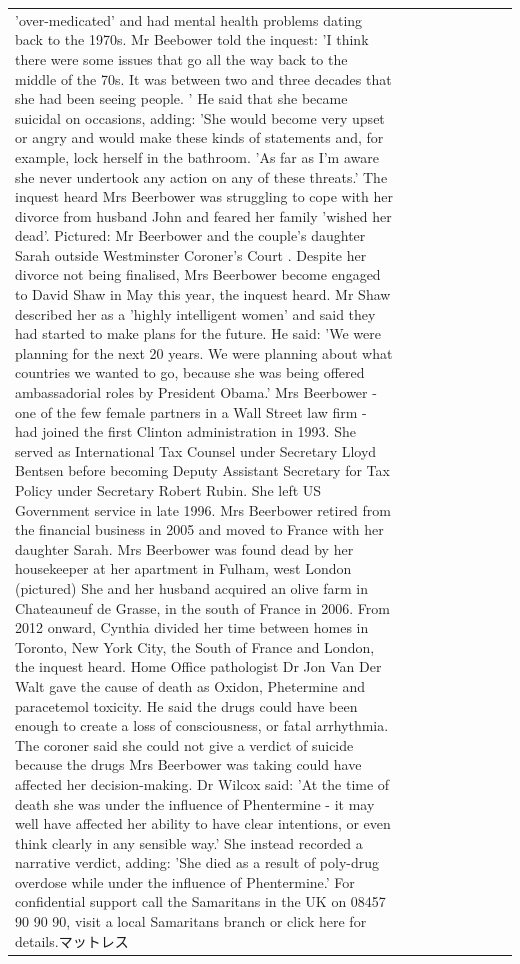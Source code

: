 \begin{table}[H]
\begin{tabular}{lllrlllll}
'over-medicated' and had mental health problems dating back to the 1970s. Mr Beebower told the inquest: 'I think there were some issues that go all the way back to the middle of the 70s. It was between two and three decades that she had been seeing people. ' He said that she became suicidal on occasions, adding: 'She would become very upset or angry and would make these kinds of statements and, for example, lock herself in the bathroom. 'As far as I'm aware she never undertook any action on any of these threats.' The inquest heard Mrs Beerbower was struggling to cope with her divorce from husband John and feared her family 'wished her dead'. Pictured: Mr Beerbower and the couple's daughter Sarah outside Westminster Coroner's Court . Despite her divorce not being finalised, Mrs Beerbower become engaged to David Shaw in May this year, the inquest heard. Mr Shaw described her as a 'highly intelligent women' and said they had started to make plans for the future. He said: 'We were planning for the next 20 years. We were planning about what countries we wanted to go, because she was being offered ambassadorial roles by President Obama.' Mrs Beerbower - one of the few female partners in a Wall Street law firm - had joined the first Clinton administration in 1993. She served as International Tax Counsel under Secretary Lloyd Bentsen before becoming Deputy Assistant Secretary for Tax Policy under Secretary Robert Rubin. She left US Government service in late 1996. Mrs Beerbower retired from the financial business in 2005 and moved to France with her daughter Sarah. Mrs Beerbower was found dead by her housekeeper at her apartment in Fulham, west London (pictured) She and her husband acquired an olive farm in Chateauneuf de Grasse, in the south of France in 2006. From 2012 onward, Cynthia divided her time between homes in Toronto, New York City, the South of France and London, the inquest heard. Home Office pathologist Dr Jon Van Der Walt gave the cause of death as Oxidon, Phetermine and paracetemol toxicity. He said the drugs could have been enough to create a loss of consciousness, or fatal arrhythmia. The coroner said she could not give a verdict of suicide because the drugs Mrs Beerbower was taking could have affected her decision-making. Dr Wilcox said: 'At the time of death she was under the influence of Phentermine - it may well have affected her ability to have clear intentions, or even think clearly in any sensible way.' She instead recorded a narrative verdict, adding: 'She died as a result of poly-drug overdose while under the influence of Phentermine.' For confidential support call the Samaritans in the UK on 08457 90 90 90, visit a local Samaritans branch or click here for details.マットレス \\

\end{tabular}
\end{table}
